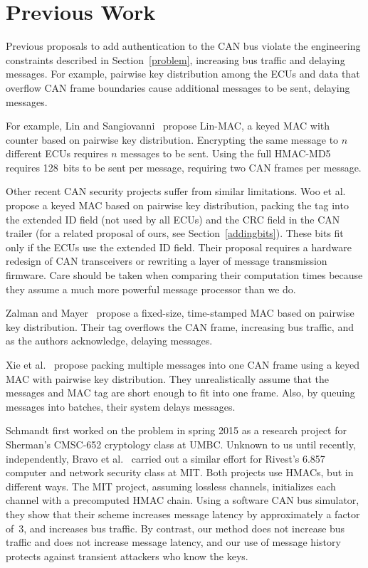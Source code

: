 \section{Previous Work}
\label{previous}

Previous proposals to add authentication to the CAN bus violate the engineering constraints described
in Section~\ref{problem}, increasing bus traffic and delaying messages.  For example, pairwise
key distribution among the ECUs and data that overflow CAN frame boundaries cause additional messages to be sent,
delaying messages.

For example, Lin and Sangiovanni~\cite{Lin-MAC} propose Lin-MAC, a keyed MAC with counter based on
pairwise key distribution.  Encrypting the same message to $n$ different ECUs requires $n$
messages to be sent.   Using the full HMAC-MD5 requires 128~bits to be sent per message, requiring two CAN frames per message.

Other recent CAN security projects suffer from similar limitations. 
Woo et al.~\cite{Woo-14} propose a keyed MAC based on pairwise key distribution,
packing the tag into the extended ID field (not used by all ECUs) and the CRC field in the CAN trailer
(for a related proposal of ours, see Section~\ref{addingbits}). 
These bits fit only if the ECUs use the extended ID field. 
Their proposal requires a hardware redesign of CAN transceivers or rewriting a layer of message transmission firmware.
Care should be taken when comparing their computation times because
they assume a much more powerful message processor than we do. 

Zalman and Mayer~\cite{Zalman-14} propose a fixed-size, time-stamped MAC based on pairwise key distribution.
Their tag overflows the CAN frame, increasing bus traffic, and as the authors acknowledge,
delaying messages.

Xie et al.~\cite{Xie-15} propose packing multiple messages into one CAN frame using a keyed MAC with 
pairwise key distribution.   They unrealistically assume that the messages and MAC tag are short
enough to fit into one frame.  Also, by queuing messages into batches, their system delays messages.

Schmandt first worked on the problem in spring 2015 as a research project for Sherman's CMSC-652 cryptology class at UMBC.
Unknown to us until recently, independently, Bravo et al.~\cite{MIT2015} carried out a similar effort 
for Rivest's 6.857 computer and network security class at MIT.  Both projects use HMACs, but in different ways.
The MIT project, assuming lossless channels, initializes each channel with a precomputed HMAC chain.
Using a software CAN bus simulator, they show that their scheme increases message latency by
approximately a factor of~3, and increases bus traffic.  By contrast, our method does not increase
bus traffic and does not increase message latency, and our use of message history protects against transient
attackers who know the keys.

